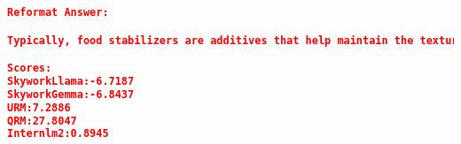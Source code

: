 \begin{lstlisting}[language=json,numbers=none]
Reformat Answer:

Typically, food stabilizers are additives that help maintain the texture and consistency of food products, preventing ingredients from separating and extending shelf life. Common stabilizers include gelatin, pectin, and starches derived from corn or potatoes. Durian seeds, often discarded as waste, contain a high amount of starch that can be extracted and used as a thickening agent, emulsifier, and stabilizer in food products. The process involves drying and grinding the seeds into a powder, which can then be added to food to improve texture and stability.

Scores:
SkyworkLlama:-6.7187
SkyworkGemma:-6.8437
URM:7.2886
QRM:27.8047
Internlm2:0.8945
\end{lstlisting}